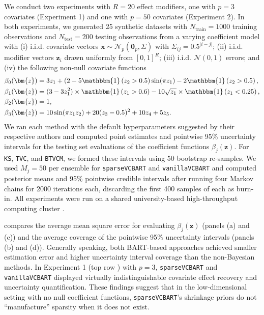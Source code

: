 \documentclass[11pt]{article}
\newcommand{\ind}[1]{\mathbbm{1}\left( #1 \right)} %
\newcommand{\normaldist}[2]{\mathcal{N}\left(#1,#2\right)} %
\newcommand{\mvnormaldist}[3]{\mathcal{N}_{#1}\left(#2,#3\right)} %
\newcommand{\bx}{\bm{x}}
\newcommand{\bz}{\bm{z}}
\theoremstyle{plain}
\theoremstyle{definition}
\theoremstyle{plain}
\begin{document}
We conduct two experiments with $R = 20$ effect modifiers, one with $p = 3$ covariates (Experiment 1) and one with $p = 50$ covariates (Experiment 2).
In both experiments, we generated 25 synthetic datasets with $N_{\text{train}} = 1000$ training observations and $N_{\text{test}} = 200$ testing observations from a varying coefficient model with (i) i.i.d. covariate vectors $\bx \sim \mvnormaldist{p}{\mathbf{0}_{p}}{\Sigma}$ with $\Sigma_{ij} = 0.5^{\lvert i - j \rvert}$; (ii) i.i.d. modifier vectors $\bz_{i}$ drawn uniformly from $[0,1]^{R}$; (iii) i.i.d. $\normaldist{0}{1}$ errors; and (iv) the following non-null covariate functions
\begin{align*}
\beta_{0}(\bz) &= 3z_{1} + (2 - 5 \ind{z_{2} > 0.5}\sin(\pi z_{1}) - 2 \ind{z_{2} > 0.5}, \\
\beta_{1}(\bz) &= (3 - 3z^{2}_{1}) \times \ind{z_{1} > 0.6} - 10\sqrt{z_{1}} \times \ind{z_{1} < 0.25}, \\
\beta_{2}(\bz) &= 1, \\
\beta_{3}(\bz) &= 10\sin(\pi z_{1}z_{2}) + 20(z_{3} - 0.5)^{2} + 10z_{4} + 5z_{5}.
\end{align*}
We ran each method with the default hyperparameters suggested by their respective authors and computed point estimates and pointwise 95\% uncertainty intervals for the testing set evaluations of the coefficient functions $\beta_{j}(\bz).$ 
For \texttt{KS}, \texttt{TVC}, and \texttt{BTVCM}, we formed these intervals using $50$ bootstrap re-samples.
We used $M_{j} = 50$ per ensemble for \texttt{sparseVCBART} and \texttt{vanillaVCBART} and computed posterior means and 95\% pointwise credible intervals after running four Markov chains for 2000 iterations each, discarding the first 400 samples of each as burn-in. 
All experiments were run on a shared university-based high-throughput computing cluster \citep{chtc_2006}. 

 compares the average mean square error for evaluating $\beta_{j}(\bz)$ (panels (a) and (c)) and the average coverage of the pointwise 95\% uncertainty intervals (panels (b) and (d)).
Generally speaking, both BART-based approaches achieved smaller estimation error and higher uncertainty interval coverage than the non-Bayesian methods.
In Experiment 1 (top row ) with $p = 3$, \texttt{sparseVCBART} and \texttt{vanillaVCBART} displayed virtually indistinguishable covariate effect recovery and uncertainty quantification.
These findings suggest that in the low-dimensional setting with no null coefficient functions, \texttt{sparseVCBART}'s shrinkage priors do not ``manufacture'' sparsity when it does not exist.
\end{document}
